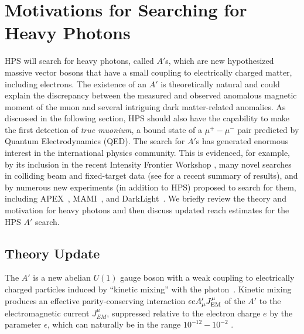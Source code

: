 
\section{Motivations for Searching for Heavy Photons}

HPS will search for heavy photons, called $A'$s, which are new hypothesized massive vector bosons that have a small coupling 
to electrically charged matter, including electrons.  
The existence of an $A'$ is theoretically natural and could explain the discrepancy between the measured and 
observed anomalous magnetic moment of the muon and several intriguing dark matter-related anomalies.  
As discussed in the following section, HPS should also have the capability to make the first detection of \emph{true muonium}, a bound state of a 
$\mu^+ - \mu^-$ pair predicted by Quantum Electrodynamics (QED).  
The search for $A'$s has generated enormous interest in the international physics community.  This is evidenced, for example, 
by its inclusion in the recent Intensity Frontier Workshop \cite{Kamionkowski:2010mi,Hewett:2012ns}, 
many novel searches in colliding beam and fixed-target data (see \cite{Dark2012} for a recent summary of results),  
and by numerous new experiments (in addition to HPS) proposed to search for them, including 
APEX~\cite{Essig:2010xa,Abrahamyan:2011gv},  MAMI~\cite{Merkel:2011ze}, and DarkLight~\cite{Freytsis:2009bh}.
We briefly review the theory and motivation for heavy photons and then discuss updated reach estimates for the HPS $A'$ search.

\subsection{Theory Update}

The $A'$ is a new abelian $U(1)$ gauge boson with a weak coupling 
to electrically charged particles induced by ``kinetic mixing'' with the photon~\cite{Holdom:1985ag,Galison:1983pa}.  
Kinetic mixing produces an effective parity-conserving interaction
$\epsilon e A'_\mu J^\mu_{\rm EM}$ of the $A'$ to the 
electromagnetic current $J^\mu_{EM}$,  suppressed relative to the electron charge 
$e$ by the parameter $\epsilon$, which can naturally be in the range $10^{-12} -10^{-2}$ \cite{Essig:2009nc,Goodsell:2009xc,Cicoli:2011yh,Goodsell:2011wn}. 

